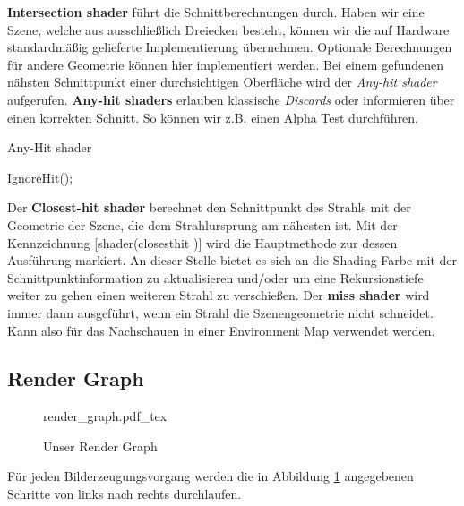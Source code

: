 \textbf{Intersection shader} führt die Schnittberechnungen durch.
Haben wir eine Szene, welche aus ausschließlich Dreiecken besteht, können wir
die auf Hardware standardmäßig gelieferte Implementierung übernehmen. 
Optionale Berechnungen für andere Geometrie können hier implementiert werden.
Bei einem gefundenen nähsten Schnittpunkt einer durchsichtigen Oberfläche wird der 
\textit{Any-hit shader} aufgerufen.
\textbf{Any-hit shaders} erlauben klassische \textit{Discards} oder informieren
über einen korrekten Schnitt. So können wir z.B. einen Alpha Test durchführen.

\begin{tcolorbox}
\begin{algorithm}[H]
    \caption{Any-Hit shader}
    \begin{algorithmic}[1]
        \State IgnoreHit();
        \EndIf
    \end{algorithmic}
    \label{alg:any hit}
\end{algorithm}
\end{tcolorbox}

Der \textbf{Closest-hit shader} berechnet den Schnittpunkt des Strahls mit der Geometrie
der Szene, die dem Strahlursprung am nähesten ist.
Mit der Kennzeichnung [shader(\dq closesthit \dq)] wird die Hauptmethode zur 
dessen Ausführung markiert. An dieser Stelle bietet es sich an die Shading Farbe 
mit der Schnittpunktinformation zu aktualisieren und/oder um eine Rekursionstiefe weiter 
zu gehen einen weiteren Strahl zu verschießen. 
Der \textbf{miss shader} wird immer dann ausgeführt, wenn ein Strahl die
Szenengeometrie nicht schneidet. Kann also für das Nachschauen in einer 
Environment Map verwendet werden. 

\subsection{Render Graph}

\begin{figure}[H]
    \begin{tcolorbox}
    \centering
    \def\svgwidth{\columnwidth}
    {render_graph.pdf_tex}
    \end{tcolorbox}
    \caption{Unser Render Graph}
    \label{pic:Render Graph}
\end{figure}

Für jeden Bilderzeugungsvorgang werden die in Abbildung \ref{pic:Render Graph} angegebenen Schritte von links nach rechts 
durchlaufen.








